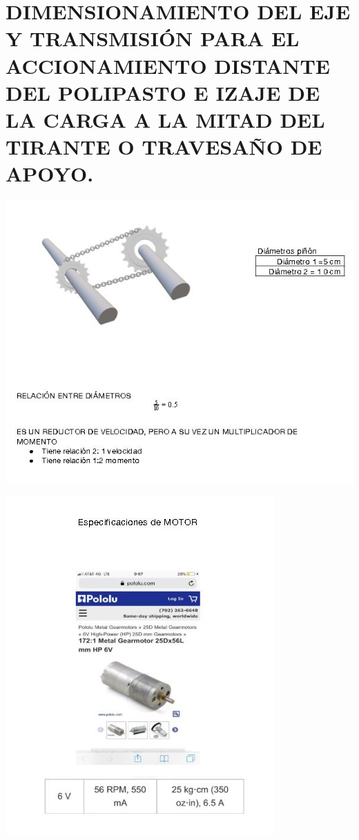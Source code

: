 \chapter{DIMENSIONAMIENTO DEL EJE Y TRANSMISIÓN PARA EL ACCIONAMIENTO DISTANTE DEL POLIPASTO E IZAJE DE LA CARGA A LA MITAD DEL TIRANTE O TRAVESAÑO DE APOYO. }
\begin{center}
\includegraphics[width=0.9\linewidth]{D/figs/DI_1.jpg} 
\end{center}

\begin{center}
\includegraphics[width=0.7\linewidth]{D/figs/DI_2.jpg} 
\end{center}

